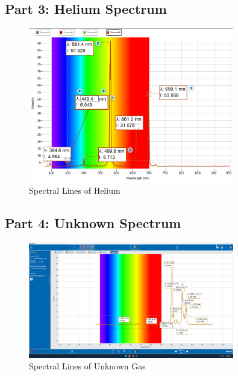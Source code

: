 \subsection{Part 3: Helium Spectrum}
\begin{figure}[H]    \centering
    \includegraphics[width=0.8\textwidth]{Results/photospectrometry/helium.png}
    \caption{Spectral Lines of Helium}
    \label{fig:helium_spectrum}
\end{figure}

\subsection{Part 4: Unknown Spectrum}
\begin{figure}[H]    \centering
    \includegraphics[width=0.8\textwidth]{Results/photospectrometry/unknown.png}
    \caption{Spectral Lines of Unknown Gas}
    \label{fig:unknown_spectrum}
\end{figure}

